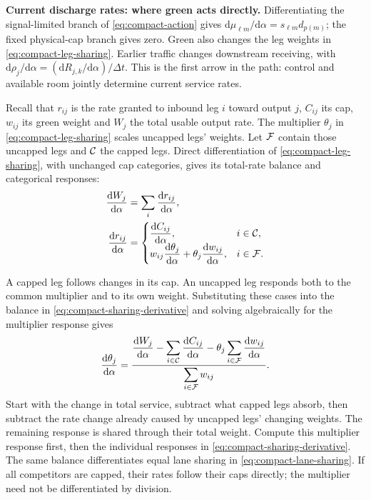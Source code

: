 \documentclass[10pt,a4paper]{article}
\begin{document}
\textbf{Current discharge rates: where green acts directly.}
Differentiating the signal-limited branch of \eqref{eq:compact-action}
gives $\mathrm d\mu_{\ell m}/\mathrm d\alpha=s_{\ell m}d_{p(m)}$;
the fixed physical-cap branch gives zero. Green also changes the leg
weights in \eqref{eq:compact-leg-sharing}. Earlier traffic changes
downstream receiving, with
$\mathrm d\rho_j/\mathrm d\alpha=(\mathrm dR_{j,k}/\mathrm d\alpha)/\Delta t$.
This is the first arrow in the path: control and available room jointly
determine current service rates.

\par\begin{samepage}
Recall that $r_{ij}$ is the rate granted to inbound leg $i$ toward output
$j$, $C_{ij}$ its cap, $w_{ij}$ its green weight and $W_j$ the total usable
output rate. The multiplier $\theta_j$ in \eqref{eq:compact-leg-sharing}
scales uncapped legs' weights. Let ${\cal F}$ contain those uncapped legs
and ${\cal C}$ the capped legs.
Direct differentiation of \eqref{eq:compact-leg-sharing}, with unchanged cap categories, gives its total-rate balance and categorical responses:
\begin{equation}
 \begin{aligned}
 \frac{\mathrm dW_j}{\mathrm d\alpha}
 &=\sum_i\frac{\mathrm dr_{ij}}{\mathrm d\alpha},\\
 \frac{\mathrm dr_{ij}}{\mathrm d\alpha}
 &=\begin{cases}
 \displaystyle\frac{\mathrm dC_{ij}}{\mathrm d\alpha},&i\in{\cal C},\\
 \displaystyle w_{ij}\frac{\mathrm d\theta_j}{\mathrm d\alpha}
       +\theta_j\frac{\mathrm dw_{ij}}{\mathrm d\alpha},&i\in{\cal F}.
 \end{cases}
 \end{aligned}
 \label{eq:compact-sharing-derivative}
\end{equation}
\par\end{samepage}

A capped leg follows changes in its cap. An uncapped leg responds both
to the common multiplier and to its own weight. Substituting these cases
into the balance in \eqref{eq:compact-sharing-derivative} and solving algebraically for the multiplier response gives
\begin{equation}
 \frac{\mathrm d\theta_j}{\mathrm d\alpha}
 =\frac{\displaystyle
 \frac{\mathrm dW_j}{\mathrm d\alpha}
 -\sum_{i\in{\cal C}}\frac{\mathrm dC_{ij}}{\mathrm d\alpha}
 -\theta_j\sum_{i\in{\cal F}}\frac{\mathrm dw_{ij}}{\mathrm d\alpha}}
 {\displaystyle\sum_{i\in{\cal F}}w_{ij}}.
 \label{eq:compact-sharing-level-derivative}
\end{equation}
Start with the change in total service, subtract what capped legs absorb,
then subtract the rate change already caused by uncapped legs' changing
weights. The remaining response is shared through their total weight.
Compute this multiplier response first, then the individual responses in
\eqref{eq:compact-sharing-derivative}. The same balance differentiates
equal lane sharing in \eqref{eq:compact-lane-sharing}.
If all competitors are capped, their rates follow their caps directly;
the multiplier need not be differentiated by division.
\end{document}
